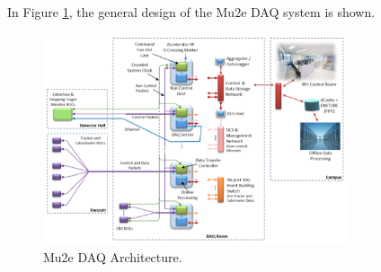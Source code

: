 In Figure \ref{fig:linktodaq}, the general design of the Mu2e DAQ system is shown.
\begin{figure}[!h]
\centering
\includegraphics[width =0.8\textwidth]{figures/png/Screenshot_20240206_144803.png}
\caption{Mu2e DAQ Architecture.}
\label{fig:linktodaq}
\end{figure}
